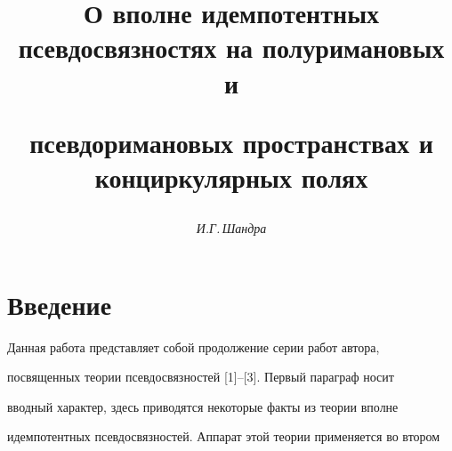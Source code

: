 \newcommand{\tts}[1]{}







\setcounter{page}{58}















\author{\it И.Г.\,Шандра}




\title{О вполне идемпотентных псевдосвязностях на полуримановых и


псевдоримановых пространствах и конциркулярных полях}





\date{}




\pagestyle{plain} %







\maketitle


\label{begin}





\section*{Введение}





Данная работа представляет собой продолжение серии работ автора,


посвященных теории псевдосвязностей [1]--[3]. Первый параграф носит


вводный характер, здесь приводятся некоторые факты из теории вполне


идемпотентных псевдосвязностей. Аппарат этой теории применяется во втором


